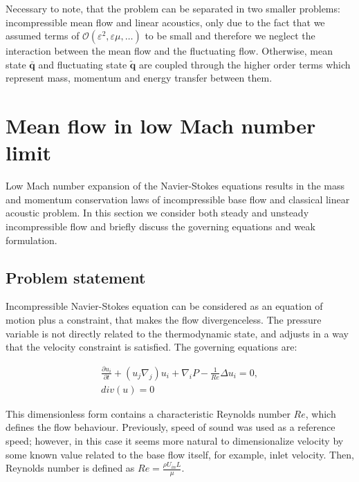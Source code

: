 Necessary to note, that the problem can be separated in two smaller problems: incompressible mean flow and linear acoustics, only due to the fact that we assumed terms of $\mathcal{O}(\varepsilon^2, \varepsilon \mu, \dots)$ to be small and therefore we neglect the interaction between the mean flow and the fluctuating flow. Otherwise, mean state $\bar{\mathbf{q}}$ and fluctuating state $\tilde{\mathbf{q}}$ are coupled through the higher order terms which represent mass, momentum and energy transfer between them.
\clearpage
\section{Mean flow in low Mach number limit}

Low Mach number expansion of the Navier-Stokes equations results in the mass and momentum conservation laws of incompressible base flow and classical linear acoustic problem. In this section we consider both steady and unsteady incompressible flow and briefly discuss the governing equations and weak formulation.

\subsection{Problem statement}

Incompressible Navier-Stokes equation can be considered as an equation of motion plus a constraint, that makes the flow divergenceless. The pressure variable is not directly related to the thermodynamic state, and adjusts in a way that the velocity constraint is satisfied. The governing equations are:

\begin{subequations}
\label{eq:IncNSeqFull}
    \begin{align}
    \label{eq:IncNSeq}
    \frac{\partial u_i}{\partial t} + (u_j \nabla_j) u_i + \nabla_i P - \frac{1}{Re} \Delta u_i = 0, \\
    \label{eq:div0cons}
    div(u) = 0
    \end{align}
\end{subequations}

This dimensionless form contains a characteristic Reynolds number $Re$, which defines the flow behaviour. Previously, speed of sound was used as a reference speed; however, in this case it seems more natural to dimensionalize velocity by some known value related to the base flow itself, for example, inlet velocity. Then, Reynolds number is defined as $Re = \frac{\rho U_{in} L}{\mu}$.


